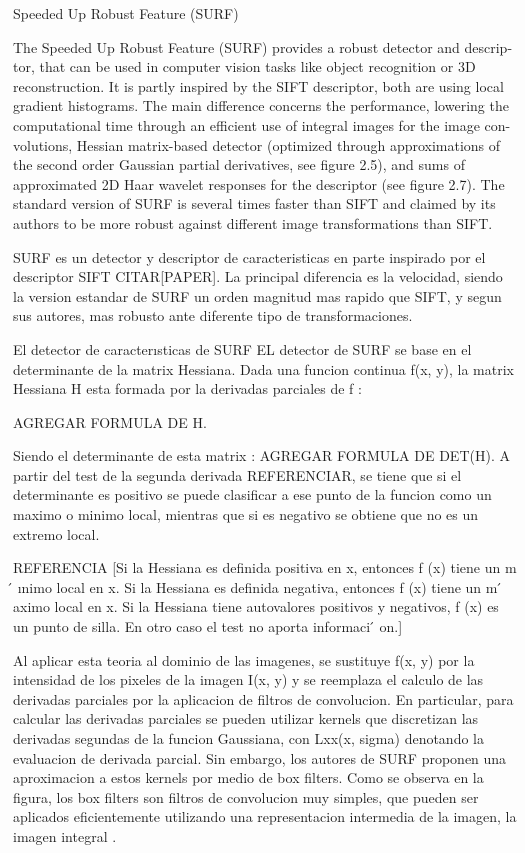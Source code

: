 \begin{subsection}
{Speeded Up Robust Feature (SURF)}

The Speeded Up Robust Feature (SURF) provides a robust detector and descrip-
tor, that can be used in computer vision tasks like object recognition or 3D
reconstruction. It is partly inspired by the SIFT descriptor, both are using local
gradient histograms. The main difference concerns the performance, lowering the
computational time through an efficient use of integral images for the image con-
volutions, Hessian matrix-based detector (optimized through approximations of the
second order Gaussian partial derivatives, see figure 2.5), and sums of approximated
2D Haar wavelet responses for the descriptor (see figure 2.7). The standard version
of SURF is several times faster than SIFT and claimed by its authors to be more
robust against different image transformations than SIFT.

SURF es un detector y descriptor de caracteristicas \cite{bay2008speeded} en parte inspirado por el descriptor SIFT CITAR[PAPER]. La principal diferencia es la velocidad, siendo la version estandar de SURF un orden magnitud mas rapido que SIFT, y segun sus autores, mas robusto ante diferente tipo de transformaciones.

\begin{subsection} 
{El detector de caracterısticas de SURF}
EL detector de SURF se base en el determinante de la matrix Hessiana. Dada una funcion continua f(x, y), la matrix Hessiana H esta formada por la derivadas parciales de f :

AGREGAR FORMULA DE H.

Siendo el determinante de esta matrix : AGREGAR FORMULA DE DET(H).
A partir del test de la segunda derivada REFERENCIAR, se tiene que si el determinante es positivo se puede clasificar a ese punto de la funcion como un maximo o minimo local, mientras que si es negativo se obtiene que no es un extremo local.

REFERENCIA
[Si la Hessiana es definida positiva en x, entonces f (x) tiene un m ́
ınimo local en x. Si la Hessiana es
definida negativa, entonces f (x) tiene un m ́
aximo local en x. Si la Hessiana tiene autovalores positivos y
negativos, f (x) es un punto de silla. En otro caso el test no aporta informaci ́
on.]

Al aplicar esta teoria al dominio de las imagenes, se sustituye f(x, y)
por la intensidad de los pixeles de la imagen I(x, y) y se reemplaza el calculo de 
las derivadas parciales por la aplicacion de filtros de convolucion. En particular, para calcular las derivadas parciales se pueden utilizar kernels que discretizan las derivadas segundas de la funcion Gaussiana, con Lxx(x, sigma) denotando la evaluacion de derivada parcial. Sin embargo, los autores de SURF proponen una aproximacion a estos kernels por medio de box filters. Como se observa en la figura, los box filters son filtros de convolucion muy simples, que pueden ser aplicados eficientemente utilizando una representacion intermedia de la imagen, la imagen integral \cite{Crow84}.


\end{subsection}
\end{subsection}
